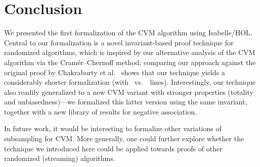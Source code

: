\section{Conclusion}\label{sec:conclusion}
We presented the first formalization of the CVM algorithm using Isabelle/HOL.
Central to our formalization is a novel invariant-based proof technique for randomized algorithms, which is inspired by our alternative analysis of the CVM algorithm via the Cram\'{e}r--Chernoff method; comparing our approach against the original proof by Chakraborty et al.~\cite{chakraborty2023} shows that our technique yields a considerably shorter formalization (with \locnew~vs.~\locold~lines).
Interestingly, our technique also readily generalized to a new CVM variant with stronger properties (totality and unbiasedness)---we formalized this latter version using the same invariant, together with a new library of results for negative association.

In future work, it would be interesting to formalize other variations of subsampling for CVM.
More generally, one could further explore whether the technique we introduced here could be applied towards proofs of other randomized (streaming) algorithms.
